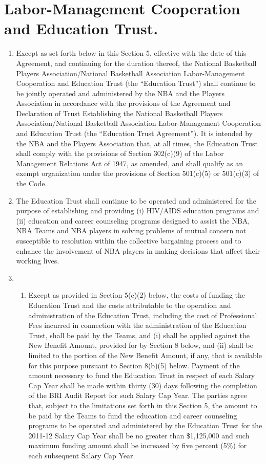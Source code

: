 \documentclass[
]{book}
\providecommand{\tightlist}{%
  \setlength{\itemsep}{0pt}\setlength{\parskip}{0pt}}
\begin{document}
\hypertarget{labor-management-cooperation-and-education-trust.}{%
\section{Labor-Management Cooperation and Education Trust.}\label{labor-management-cooperation-and-education-trust.}}

\begin{enumerate}
\def\labelenumi{(\alph{enumi})}
\item
  Except as set forth below in this Section 5, effective with the date of this Agreement, and continuing for the duration thereof, the National Basketball Players Association/National Basketball Association Labor-Management Cooperation and Education Trust (the ``Education Trust'') shall continue to be jointly operated and administered by the NBA and the Players Association in accordance with the provisions of the Agreement and Declaration of Trust Establishing the National Basketball Players Association/National Basketball Association Labor-Management Cooperation and Education Trust (the ``Education Trust Agreement''). It is intended by the NBA and the Players Association that, at all times, the Education Trust shall comply with the provisions of Section 302(c)(9) of the Labor Management Relations Act of 1947, as amended, and shall qualify as an exempt organization under the provisions of Section 501(c)(5) or 501(c)(3) of the Code.
\item
  The Education Trust shall continue to be operated and administered for the purpose of establishing and providing (i) HIV/AIDS education programs and (ii) education and career counseling programs designed to assist the NBA, NBA Teams and NBA players in solving problems of mutual concern not susceptible to resolution within the collective bargaining process and to enhance the involvement of NBA players in making decisions that affect their working lives.
\item
  \begin{enumerate}
  \def\labelenumii{(\arabic{enumii})}
  \tightlist
  \item
    Except as provided in Section 5(c)(2) below, the costs of funding the Education Trust and the costs attributable to the operation and administration of the Education Trust, including the cost of Professional Fees incurred in connection with the administration of the Education Trust, shall be paid by the Teams, and (i) shall be applied against the New Benefit Amount, provided for by Section 8 below, and (ii) shall be limited to the portion of the New Benefit Amount, if any, that is available for this purpose pursuant to Section 8(b)(5) below. Payment of the amount necessary to fund the Education Trust in respect of each Salary Cap Year shall be made within thirty (30) days following the completion of the BRI Audit Report for such Salary Cap Year. The parties agree that, subject to the limitations set forth in this Section 5, the amount to be paid by the Teams to fund the education and career counseling programs to be operated and administered by the Education Trust for the 2011-12 Salary Cap Year shall be no greater than \$1,125,000 and such maximum funding amount shall be increased by five percent (5\%) for each subsequent Salary Cap Year.

\end{enumerate}
\end{enumerate}
\end{document}
